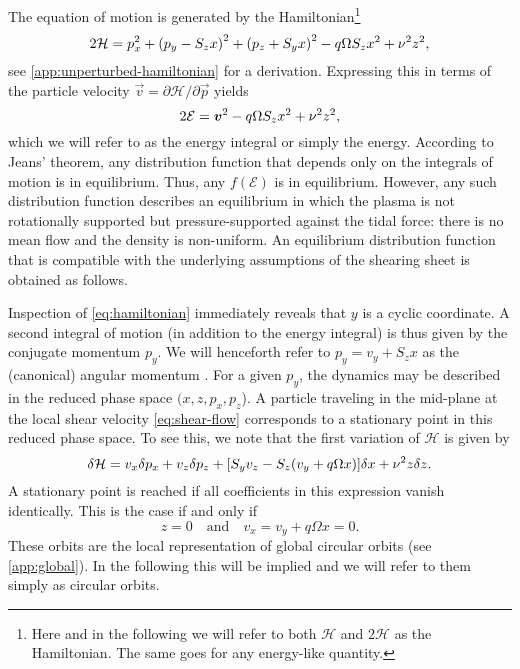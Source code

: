 \documentclass[aps,pre,notitlepage,amsmath,amssymb,amsfonts,nobibnotes,nofootinbib,superscriptaddress]{revtex4-1}
\begin{document}
The equation of motion  is generated by the
Hamiltonian\footnote{Here and in the following we will refer to both
  $\mathcal{H}$ and $2\mathcal{H}$ as the Hamiltonian. The same goes for any
  energy-like quantity.}
\begin{equation}
  \label{eq:hamiltonian}
  2\mathcal{H} = p_x^2 + {(p_y - S_z x)}^2 + {(p_z + S_y x)}^2
  - q\Omega S_z x^2 + \vfreq^2 z^2,
\end{equation}
see \cref{app:unperturbed-hamiltonian} for a derivation. Expressing this in
terms of the particle velocity $\vec{v}=\partial\mathcal{H}/\partial\vec{p}$
yields
\begin{equation}
  \label{eq:energy-integral}
  2\mathcal{E} = \vec{v}^2 - q\Omega S_z x^2 + \vfreq^2 z^2,
\end{equation}
which we will refer to as the energy integral or simply the energy. According
to Jeans' theorem, any distribution function that depends only on the
integrals of motion is in equilibrium. Thus, any $f(\mathcal{E})$ is in
equilibrium. However, any such distribution function describes an equilibrium
in which the plasma is not rotationally supported but pressure-supported
against the tidal force: there is no mean flow and the density is non-uniform.
An equilibrium distribution function that is compatible with the underlying
assumptions of the shearing sheet is obtained as follows.

Inspection of \cref{eq:hamiltonian} immediately reveals that $y$ is a cyclic
coordinate. A second integral of motion (in addition to the energy integral)
is thus given by the conjugate momentum $p_y$. We will henceforth refer to
$p_y=v_y+S_z{}x$ as the (canonical) angular momentum
\citep[cf.][]{Wisdom1988}. For a given $p_y$, the dynamics may be described in
the reduced phase space $(x,z,p_x,p_z$). A particle traveling in the mid-plane
at the local shear velocity \cref{eq:shear-flow} corresponds to a stationary
point in this reduced phase space. To see this, we note that the first
variation of $\mathcal{H}$ is given by
\begin{equation}
  \delta\mathcal{H} = v_x\delta p_x + v_z\delta p_z
  + [S_y v_z - S_z(v_y + q\Omega x)]\delta x + \nu^2 z\delta z.
\end{equation}
A stationary point is reached if all coefficients in this expression vanish
identically. This is the case if and only if
\begin{equation}
  z = 0 \quad\textrm{and}\quad v_x = v_y + q\Omega x = 0.
\end{equation}
These orbits are the local representation of global circular orbits (see
\cref{app:global}). In the following this will be implied and we will refer to
them simply as circular orbits.
\end{document}
